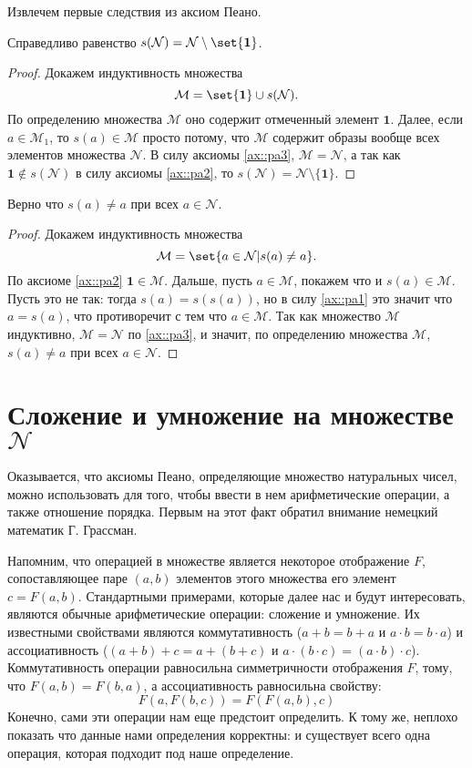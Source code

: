 \documentclass{article}
\begin{document}
Извлечем первые следствия из аксиом Пеано. 
\begin{lemma}
    \label{lm::shifting-lemma-1}
    Справедливо равенство \(s(\mathcal{N}) = \mathcal{N} \setminus \set{\mathbf{1}} \).
\end{lemma}
\begin{proof}
    Докажем индуктивность множества
    \[
        \mathcal{M} = \set{\mathbf{1}} \cup s(\mathcal{N}). 
    \]
    По определению множества \( \mathcal{M} \) оно содержит отмеченный элемент $\mathbf{1}$. Далее, если \( a \in \mathcal{M}_1 \), то \( s(a) \in \mathcal{M} \) просто потому, что \( \mathcal{M} \) содержит образы вообще всех элементов множества \( \mathcal{N} \). В силу аксиомы \ref{ax::pa3}, \( \mathcal{M} = \mathcal{N} \), а так как \( \mathbf{1} \notin s(\mathcal{N}) \) в силу аксиомы \ref{ax::pa2}, то \( s(\mathcal{N}) = \mathcal{N} \setminus \{\mathbf{1}\} \). 
\end{proof}
\begin{lemma}
    \label{lm::shifting-lemma-2}
    Верно что \( s(a) \neq a \) при всех \( a \in \mathcal{N} \).    
\end{lemma}
\begin{proof}
    Докажем индуктивность множества
    \[
        \mathcal{M} = \set{ a \in \mathcal{N} | s(a) \neq a }.
    \]
    По аксиоме \ref{ax::pa2} $\mathbf{1} \in \mathcal{M}$. Дальше, пусть $a \in \mathcal{M}$, покажем что и $s(a) \in \mathcal{M}$. Пусть это не так: тогда $s(a) = s(s(a))$, но в силу \ref{ax::pa1} это значит что $a = s(a)$, что противоречит с тем что $a \in \mathcal{M}$. Так как множество $\mathcal{M}$ индуктивно, $\mathcal{M} = \mathcal{N}$ по \ref{ax::pa3}, и значит, по определению множества $\mathcal{M}$,  \( s(a) \neq a \) при всех \( a \in \mathcal{N} \). 
\end{proof}

\section{Сложение и умножение на множестве \texorpdfstring{$\mathcal{N}$}{N}}
Оказывается, что аксиомы Пеано, определяющие множество натуральных чисел, можно использовать для того, чтобы ввести в нем арифметические операции, а также отношение порядка. Первым на этот факт обратил внимание немецкий математик Г. Грассман.

Напомним, что операцией в множестве является некоторое отображение $F$, сопоставляющее паре $(a, b)$ элементов этого множества его элемент $c = F(a, b)$. Стандартными примерами, которые далее нас и будут интересовать, являются обычные арифметические операции: сложение и умножение. Их известными свойствами являются коммутативность ($a + b = b + a$ и $a \cdot b = b \cdot a$) и ассоциативность ($(a + b) + c = a + (b + c)$ и $a \cdot (b \cdot c) = (a \cdot b) \cdot c$). Коммутативность операции равносильна симметричности отображения $F$, \ie тому, что $F(a, b) = F(b, a)$, а ассоциативность равносильна свойству:
\[
    F(a, F(b, c)) = F(F(a, b), c)
\]
Конечно, сами эти операции нам еще предстоит определить. К тому же, неплохо показать что данные нами определения корректны: и существует всего одна операция, которая подходит под наше определение.
\end{document}
